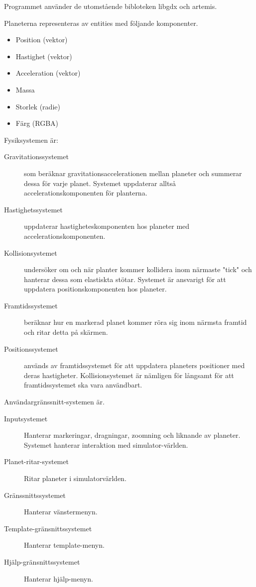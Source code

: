 Programmet använder de utomstående bibloteken libgdx och artemis.

Planeterna representeras av entities med följande komponenter.
\begin{itemize}
    \item Position (vektor)
    \item Hastighet (vektor)
    \item Acceleration (vektor)
    \item Massa
    \item Storlek (radie)
    \item Färg (RGBA)
\end{itemize}

Fysiksystemen är:
\begin{description}
    \item[Gravitationssystemet] som beräknar gravitationsaccelerationen mellan planeter
        och summerar dessa för varje planet.
        Systemet uppdaterar alltså accelerationskomponenten för planterna.
    \item[Hastighetssystemet] uppdaterar hastigheteskomponenten hos
        planeter med accelerationskomponenten.
    \item[Kollisionsystemet] undersöker om och när planter kommer kollidera
        inom närmaste "tick" och hanterar dessa som elastiskta stötar.
        Systemet är ansvarigt för att uppdatera positionskomponenten
        hos planeter.
    \item[Framtidssystemet] beräknar hur en markerad planet
        kommer röra sig inom närmsta framtid och ritar detta på skärmen.
    \item[Positionssystemet] används av framtidssystemet för att uppdatera
        planeters positioner med deras hastigheter. Kollisionsystemet
        är nämligen för långsamt för att framtidssystemet ska
        vara användbart.
\end{description}

Användargränssnitt-systemen är.
\begin{description}
    \item[Inputsystemet] Hanterar markeringar, dragningar,
        zoomning och liknande av planeter.
        Systemet hanterar interaktion med simulator-världen.
    \item[Planet-ritar-systemet] Ritar planeter i simulatorvärlden.
    \item[Gränssnittssystemet] Hanterar vänstermenyn.
    \item[Template-gränsnittssystemet] Hanterar template-menyn.
    \item[Hjälp-gränsnittssystemet] Hanterar hjälp-menyn.
\end{description}

